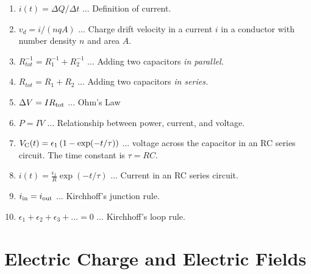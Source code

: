 \documentclass[10pt]{article}
\begin{document}
\begin{enumerate}
\item $i(t) = \Delta Q/\Delta t$ ... Definition of current.
\item $v_d = i/(nqA)$ ... Charge drift velocity in a current $i$ in a conductor with number density $n$ and area $A$.
\item $R_{tot}^{-1} = R_1^{-1} + R_2^{-1}$ ... Adding two capacitors \textit{in parallel.}
\item $R_{tot} = R_1 + R_2$ ... Adding two capacitors \textit{in series.}
\item $\Delta V = I R_{\rm tot}$ ... Ohm's Law
\item $P = I V$ ... Relationship between power, current, and voltage.
\item $V_{\rm C}(t) = \epsilon_1 \left(1 - \exp(-t/\tau)\right)$ ... voltage across the capacitor in an RC series circuit.  The time constant is $\tau = RC$.
\item $i(t) = \frac{\epsilon_1}{R} \exp(-t/\tau)$ ... Current in an RC series circuit.
\item $i_{\rm in} = i_{\rm out}$ ... Kirchhoff's junction rule.
\item $\epsilon_1 + \epsilon_2 + \epsilon_3 + ... = 0$ ... Kirchhoff's loop rule.
\end{enumerate}

\clearpage

\section{Electric Charge and Electric Fields}
\end{document}

